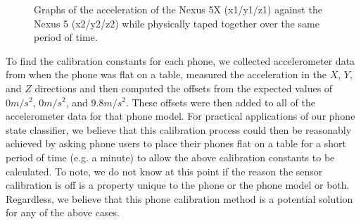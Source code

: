 \begin{figure}[h]
\begin{center}
 \scalebox{0.375}{}
  \scalebox{0.375}{}
  \scalebox{0.375}{}
 \caption{Graphs of the acceleration of the Nexus 5X (x1/y1/z1) against the Nexus 5 (x2/y2/z2) while physically taped together over the same period of time.}
\label{fig:accelGraph}
\end{center}
\end{figure}


To find the calibration constants for each phone, we collected accelerometer
data from when the phone was flat on a table, measured the acceleration in the
$X$, $Y$, and $Z$ directions and then computed the offsets from the expected values of
$0m/s^2$, $0m/s^2$, and $9.8m/s^2$. 
These offsets were then added to all of the accelerometer data for that phone model.
For practical applications of our phone state classifier, we believe that this calibration process
could then be reasonably achieved by asking phone users to place their phones flat on a table for a short period of time (e.g. a minute)
to allow the above calibration constants to be calculated.
To note, we do not know at this point if the reason the sensor calibration is off is a property unique to the phone or the phone model or both.
Regardless, we believe that this phone calibration method is a potential solution for any of the above cases.  


